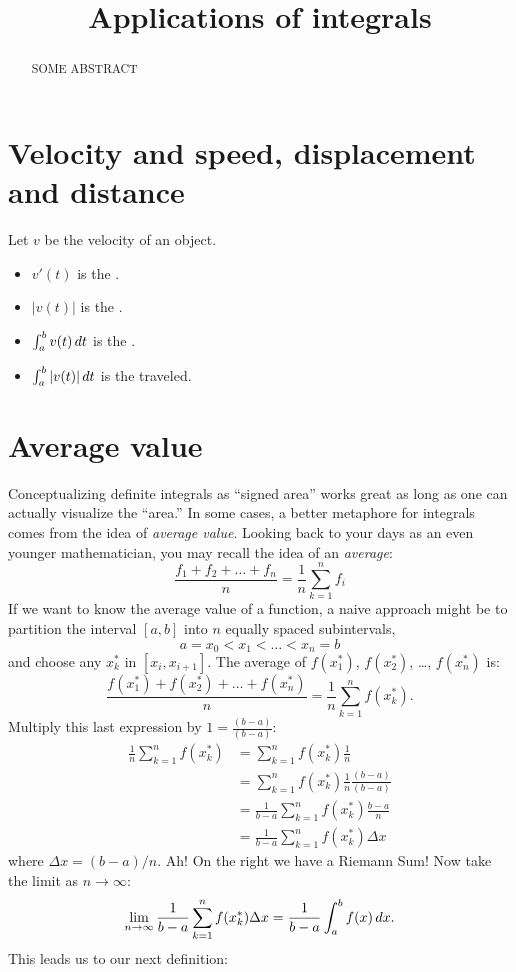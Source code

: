 \documentclass{ximera}
\title[Dig-In:]{Applications of integrals}
\begin{document}
\begin{abstract}
SOME ABSTRACT
\end{abstract}
\maketitle



\section{Velocity and speed, displacement and distance}

\begin{definition}
  Let $v$ be the velocity of an object.
  \begin{itemize}
  \item $v'(t)$ is the .
  \item $|v(t)|$ is the .
  \item $\int_a^b v(t) \,d t$ is the .
  \item $\int_a^b |v(t)| \,d t$ is the  traveled.
  \end{itemize}
\end{definition}


\section{Average value}

Conceptualizing definite integrals as ``signed area'' works great as
long as one can actually visualize the ``area.'' In some cases, a
better metaphore for integrals comes from the idea of \textit{average
  value}.  Looking back to your days as an even younger mathematician,
you may recall the idea of an \textit{average}:
\[
\frac{f_1+f_2+\dots+f_n}{n} = \frac{1}{n}\sum_{k=1}^n f_i
\]
If we want to know the average value of a function, a naive approach
might be to partition the interval $[a,b]$ into $n$ equally spaced
subintervals, 
\[
a=x_0 < x_1 < \dots < x_{n}=b
\]
and choose any $x_k^*$ in $[x_i,x_{i+1}]$. The average of $f(x_1^*)$,
$f(x_2^*)$, \dots, $f(x_n^*)$ is:
\[
\frac{f(x_1^*) + f(x_2^*) + \dots + f(x_n^*)}{n} = \frac1n\sum_{k=1}^n f(x_k^*).
\]
Multiply this last expression by $1 = \frac{(b-a)}{(b-a)}$:
\begin{align*}
  \frac1n\sum_{k=1}^n f(x_k^*) &= \sum_{k=1}^n f(x_k^*)\frac1n \\
  &= \sum_{k=1}^n f(x_k^*)\frac1n \frac{(b-a)}{(b-a)} \\
  &= \frac{1}{b-a} \sum_{k=1}^n f(x_k^*)\frac{b-a}n  \\
  &=\frac{1}{b-a} \sum_{k=1}^n f(x_k^*)\Delta x
\end{align*}
where $\Delta x = (b-a)/n$.  Ah! On the right we have a Riemann Sum!
Now take the limit as $n\to\infty$:
\[
\lim_{n\to\infty} \frac{1}{b-a} \sum_{k=1}^n f(x_k^*)\Delta x = \frac{1}{b-a} \int_a^b f(x)\,d x.
\]
This leads us to our next definition:
\end{document}
